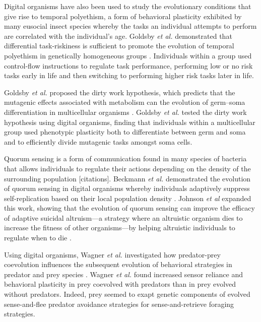 Digital organisms have also been used to study the evolutionary conditions that give rise to temporal polyethism, a form of behavioral plasticity exhibited by many eusocial insect species whereby the tasks an individual attempts to perform are correlated with the individual's age.
Goldsby \textit{et al.} demonstrated that differential task-riskiness is sufficient to promote the evolution of temporal polyethism in genetically homogeneous groups \citep{goldsby_temporal_polyethism_2012}.
Individuals within a group used control-flow instructions to regulate task performance, performing low or no risk tasks early in life and then switching to performing higher risk tasks later in life. 

Goldsby \textit{et al.} proposed the dirty work hypothesis, which predicts that the mutagenic effects associated with metabolism can the evolution of germ--soma differentiation in multicellular organisms \citep{goldsby_evolutionary_2014}.
Goldsby \textit{et al.} tested the dirty work hypothesis using digital organisms, finding that individuals within a multicellular group used phenotypic plasticity both to differentiate between germ and soma and to efficiently divide mutagenic tasks amongst soma cells.

Quorum sensing is a form of communication found in many species of bacteria that allows individuals to regulate their actions depending on the density of the surrounding population [citations].
Beckmann \textit{et al.} demonstrated the evolution of quorum sensing in digital organisms whereby individuals adaptively suppress self-replication based on their local population density \citep{beckmann_evolving_2009,beckmann_evolution_2012}.
Johnson \textit{et al} expanded this work, showing that the evolution of quorum sensing can improve the efficacy of adaptive suicidal altruism---a strategy where an altruistic organism dies to increase the fitness of other organisms---by helping altruistic individuals to regulate when to die \citep{johnson_more_2014}.  

Using digital organisms, Wagner \textit{et al.} investigated how predator-prey coevolution influences the subsequent evolution of behavioral strategies in predator and prey species \citep{wagner_behavioral_2014}.
Wagner \textit{et al.} found increased sensor reliance and behavioral plasticity in prey coevolved with predators than in prey evolved without predators. 
Indeed, prey seemed to exapt genetic components of evolved sense-and-flee predator avoidance strategies for sense-and-retrieve foraging strategies.

